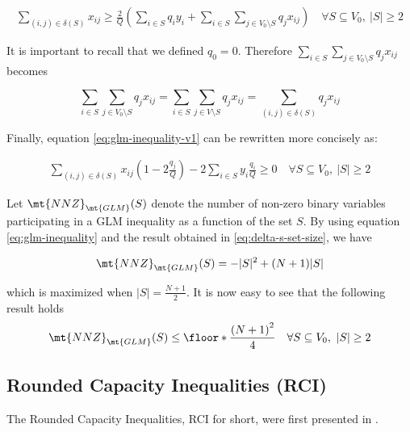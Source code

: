 \begin{equation}\label{eq:glm-inequality-v1}
	\begin{split}
		\sum_{(i, j) \in \delta(S)} x_{ij} \ge \frac{2}{Q} \left(  \sum_{i \in S} q_i y_i + \sum_{i \in S} \sum_{j \in V_0 \setminus S} q_j  x_{ij}\right) \quad \forall S \subseteq V_0,\ |S| \ge 2
	\end{split}
\end{equation}

It is important to recall that we defined $q_0 = 0$.
Therefore $\sum_{i \in S} \sum_{j \in V_0 \setminus S} q_j  x_{ij}$ becomes

\begin{equation}
	\sum_{i \in S} \sum_{j \in V_0 \setminus S} q_j  x_{ij} = \sum_{i \in S} \sum_{j \in V \setminus S} q_j  x_{ij} = \sum_{(i, j) \in \delta(S)} q_j x_{ij}
\end{equation}

Finally, equation \eqref{eq:glm-inequality-v1} can be rewritten more concisely as:

\begin{equation}\label{eq:glm-inequality}
	\begin{split}
		\sum_{(i, j) \in \delta(S)} x_{ij} \left( 1 - 2 \frac{q_j}{Q} \right)  -2 \sum_{i \in S} y_i \frac{q_i}{Q}  \ge  0   \quad \forall S \subseteq V_0,\ |S| \ge 2
	\end{split}
\end{equation}


Let $\mt{NNZ}_{\mt{GLM}}(S)$ denote the number of non-zero binary variables participating in a GLM inequality as a function of the set $S$.
By using equation \eqref{eq:glm-inequality} and the result obtained in \eqref{eq:delta-s-set-size}, we have

\begin{equation}
	\mt{NNZ}_{\mt{GLM}}(S) = -|S|^2 + (N + 1)|S|
\end{equation}

which is maximized when $|S| = \frac{N+1}{2}$.
It is now easy to see that the following result holds
\begin{equation}\label{eq:glm-nnz-ub}
	\mt{NNZ}_{\mt{GLM}}(S) \le \floor*{ \frac{\left( N + 1 \right)^2}{4}} \quad \forall S \subseteq V_0,\ |S| \ge 2
\end{equation}


\subsection{Rounded Capacity Inequalities (RCI)}
The Rounded Capacity Inequalities, RCI for short, were first presented in \cite{achuthan_capacitated_1998}.

